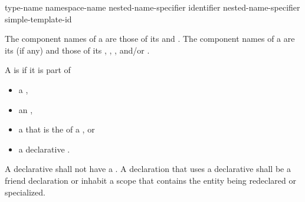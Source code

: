 \documentclass{wg21}
\begin{document}
%
%
%
\begin{bnf}
    \br
    \terminal{::}\br
    type-name \terminal{::}\br
    namespace-name \terminal{::}\br
     \terminal{::}\br
    nested-name-specifier identifier \terminal{::}\br
    nested-name-specifier  simple-template-id \terminal{::}
\end{bnf}

\pnum
{}%
The component names of a  are those of
its  and .
The component names of a  are
its  (if any) and those of its
,
,
, and/or
.

\pnum
A  is  if it is part of
\begin{itemize}
    \item
    a ,
    \item
    an ,
    \item
    a 
    that is the  of a , or
    \item
    a declarative .
\end{itemize}
A declarative 
shall not have a .
A declaration that uses a declarative 
shall be a friend declaration or
inhabit a scope that contains the entity being redeclared or specialized.
\end{document}
